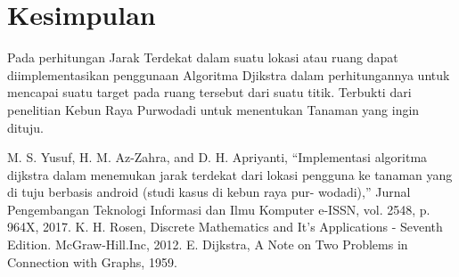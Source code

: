 \documentclass[conference]{IEEEtran}
\begin{document}
\section{Kesimpulan}
Pada perhitungan Jarak Terdekat dalam suatu lokasi atau ruang
dapat diimplementasikan penggunaan Algoritma Djikstra
dalam perhitungannya untuk mencapai suatu target pada ruang
tersebut dari suatu titik. Terbukti dari penelitian Kebun Raya
Purwodadi untuk menentukan Tanaman yang ingin dituju.

\begin{thebibliography}{00}
     M. S. Yusuf, H. M. Az-Zahra, and D. H. Apriyanti, “Implementasi
    algoritma dijkstra dalam menemukan jarak terdekat dari lokasi pengguna
    ke tanaman yang di tuju berbasis android (studi kasus di kebun raya pur-
    wodadi),” Jurnal Pengembangan Teknologi Informasi dan Ilmu Komputer
    e-ISSN, vol. 2548, p. 964X, 2017.
     K. H. Rosen, Discrete Mathematics and It’s Applications - Seventh
    Edition. McGraw-Hill.Inc, 2012.
    E. Dijkstra, A Note on Two Problems in Connection with Graphs, 1959.
    \end{thebibliography}



\end{document}
